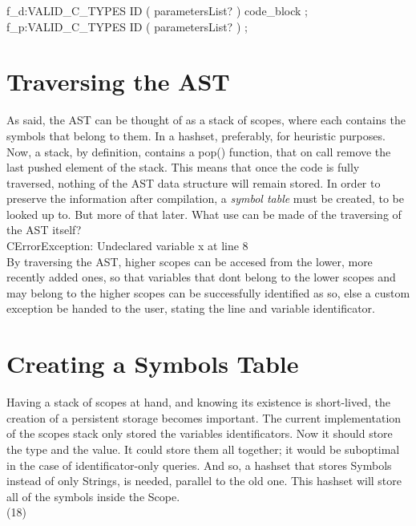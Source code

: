 \documentclass[twocolumn,10ptr]{article}
\begin{document}
f\_d:VALID\_C\_TYPES ID \textsc{}(\textsc{} parametersList? \textsc{})\textsc{} code\_block ;\\

f\_p:VALID\_C\_TYPES ID \textsc{}(\textsc{} parametersList? \textsc{})\textsc{}  ;\\


\section{ Traversing the AST}
As said, the AST can be thought of as a stack of scopes, where each contains the symbols that belong to them. In a hashset, preferably, for heuristic purposes. Now, a stack, by definition, contains a pop() function, that on call remove the last pushed element of the stack. This means that once the code is fully traversed, nothing of the AST data structure will remain stored. In order to preserve the information after compilation, a \textit{symbol table} must be created, to be looked up to. But more of that later. What use can be made of the traversing of the AST itself?\\
 
 CErrorException: Undeclared variable x at line 8\\
 
 By traversing the AST, higher scopes can be accesed from the lower, more recently added ones, so that variables that dont belong to the lower scopes and may belong to the higher scopes can be successfully identified as so, else a custom exception be handed to the user, stating the line and variable identificator.


\section{ Creating a Symbols Table}
 Having a stack of scopes at hand, and knowing its existence is short-lived, the creation of a persistent storage becomes important. The current implementation of the scopes stack only stored the variables identificators. Now it should store the type and the value. It could store them all together; it would be suboptimal in the case of identificator-only queries. And so, a hashset that stores Symbols instead of only Strings, is needed, parallel to the old one. This hashset will store all of the symbols inside the Scope.\\

(18)\\
\end{document}

